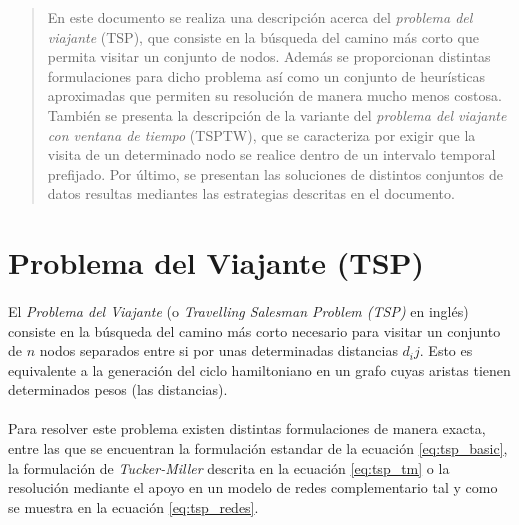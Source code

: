 \documentclass[spanish]{article}
\begin{document}
	\maketitle %

	\thispagestyle{fancy} %



	\begin{abstract}
		\noindent En este documento se realiza una descripción acerca del \emph{problema del viajante} (TSP), que consiste en la búsqueda del camino más corto que permita visitar un conjunto de nodos. Además se proporcionan distintas formulaciones para dicho problema así como un conjunto de heurísticas aproximadas que permiten su resolución de manera mucho menos costosa. También se presenta la descripción de la variante del \emph{problema del viajante con ventana de tiempo} (TSPTW), que se caracteriza por exigir que la visita de un determinado nodo se realice dentro de un intervalo temporal prefijado. Por último, se presentan las soluciones de distintos conjuntos de datos resultas mediantes las estrategias descritas en el documento.
	\end{abstract}


	\section{Problema del Viajante (TSP)}

		\paragraph{}
		El \emph{Problema del Viajante} (o \emph{Travelling Salesman Problem (TSP)} en inglés) consiste en la búsqueda del camino más corto necesario para visitar un conjunto de $n$ nodos separados entre si por unas determinadas distancias $d_ij$. Esto es equivalente a la generación del ciclo hamiltoniano en un grafo cuyas aristas tienen determinados pesos (las distancias).

		\paragraph{}
		Para resolver este problema existen distintas formulaciones de manera exacta, entre las que se encuentran la formulación estandar de la ecuación \eqref{eq:tsp_basic}, la formulación de \emph{Tucker-Miller} descrita en la ecuación \eqref{eq:tsp_tm} o la resolución mediante el apoyo en un modelo de redes complementario tal y como se muestra en la ecuación \eqref{eq:tsp_redes}.
\end{document}
